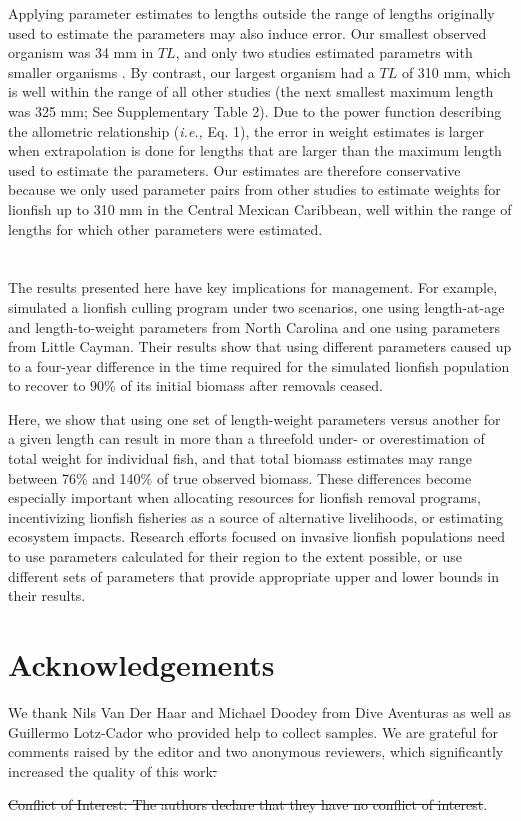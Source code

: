 \documentclass[fleqn,10pt,lineno]{wlpeerj} %
\providecommand{\DIFadd}[1]{{\protect\color{blue}\uwave{#1}}} %
\providecommand{\DIFdel}[1]{{\protect\color{red}\sout{#1}}}                      %
\providecommand{\DIFaddbegin}{} %
\providecommand{\DIFaddend}{} %
\providecommand{\DIFdelbegin}{} %
\providecommand{\DIFdelend}{} %
\begin{document}
Applying parameter estimates to lengths outside the range of lengths
originally used to estimate the parameters may also induce error. Our
smallest observed organism was 34 mm in \(TL\), and only two studies
estimated parametrs with smaller organisms
\citep{edwards_2014,sabidoitza_2016}. By contrast, our largest organism
had a \(TL\) of 310 mm, which is well within the range of all other
studies (the next smallest maximum length was 325 mm; See Supplementary
Table 2). Due to the power function describing the allometric
relationship (\emph{i.e.,} Eq. 1), the error in weight estimates is
larger when extrapolation is done for lengths that are larger than the
maximum length used to estimate the parameters. Our estimates are
therefore conservative because we only used parameter pairs from other
studies to estimate weights for lionfish up to 310 mm in the Central
Mexican Caribbean, well within the range of lengths for which other
parameters were estimated.

\DIFaddbegin \section*{\DIFadd{Conclusion}}

\DIFaddend The results presented here have key implications for management. For
example, \citet{edwards_2014} simulated a lionfish culling program under
two scenarios, one using length-at-age and length-to-weight parameters
from North Carolina and one using parameters from Little Cayman. Their
results show that using different parameters caused up to a four-year
difference in the time required for the simulated lionfish population to
recover to 90\% of its initial biomass after removals ceased.
\DIFaddbegin 

\DIFaddend Here, we show that using one set of length-weight parameters versus another for a
given length can result in more than a threefold under- or
overestimation of total weight for individual fish, and that total
biomass estimates may range between 76\% and 140\% of true observed
biomass. These differences become especially important when allocating
resources for lionfish removal programs, incentivizing lionfish
fisheries as a source of alternative livelihoods, or estimating
ecosystem impacts. Research efforts focused on invasive lionfish
populations need to use parameters calculated for their region to the
extent possible, or use different sets of parameters that provide
appropriate upper and lower bounds in their results.

\section*{Acknowledgements}

We thank Nils Van Der Haar and Michael Doodey from Dive Aventuras as
well as Guillermo Lotz-Cador who provided help to collect samples. We
are grateful for comments raised by the editor and two anonymous
reviewers, which significantly increased the quality of this work\DIFdelbegin \DIFdel{.
}%

\DIFdel{Conflict of Interest: The authors declare that they have no conflict of
interest}\DIFdelend .



\end{document}
